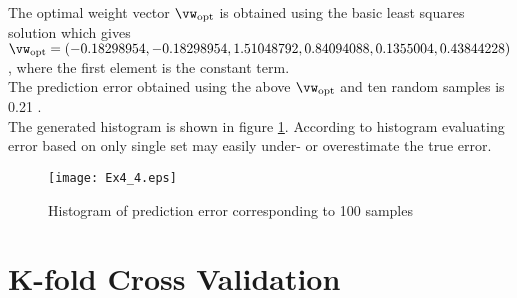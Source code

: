 \documentclass[article,11pt]{article}
\begin{document}
The optimal weight vector $\vw_\mathrm{opt}$ is obtained using the basic least squares solution which gives $\vw_\mathrm{opt}=(-0.18298954, -0.18298954, 1.51048792, 0.84094088, 0.1355004,0.43844228)$, where the first element is the constant term.\\

The prediction error obtained using the above $\vw_\mathrm{opt}$ and ten random samples is 0.21 .\\

The generated histogram is shown in figure \ref{fig:prediction_error}. According to histogram evaluating error based on only single set may
easily under- or overestimate the true error.
\begin{figure}[!h]
  \centering
  \texttt{[image: Ex4\_4.eps]}
  \caption{Histogram of prediction error corresponding to 100 samples}
  \label{fig:prediction_error}
\end{figure}


\newpage
\section{K-fold Cross Validation}
\end{document}
